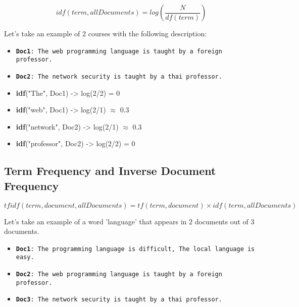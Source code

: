\begin{equation}
    idf(term, allDocuments) = log \left( \frac{N}{df(term)} \right)
\end{equation}

\noindent Let's take an example of 2 courses with the following description:
\begin{itemize}
    \item \texttt{\textbf{Doc1}: The web programming language is taught by a foreign professor.}
    \item \texttt{\textbf{Doc2}: The network security is taught by a thai professor.}
\end{itemize}

\begin{itemize}
    \item[] \textbf{idf}("The", Doc1) \hspace{1.5cm} -> \hspace{0.5cm} log(2/2) = 0
    \item[] \textbf{idf}("web", Doc1) \hspace{1.47cm} -> \hspace{0.5cm} log(2/1) $\approx$ 0.3
    \item[] \textbf{idf}("network", Doc2) \hspace{0.83cm} -> \hspace{0.5cm} log(2/1) $\approx$ 0.3
    \item[] \textbf{idf}("professor", Doc2) \hspace{0.65cm} -> \hspace{0.5cm} log(2/2) = 0
\end{itemize}

\subsection{Term Frequency and Inverse Document Frequency}

\begin{equation}
    tfidf(term, document, allDocuments) = tf(term, document) \times idf(term, allDocuments)
\end{equation}

\noindent Let's take an example of a word 'language' that appears in 2 documents out of 3 documents.

\begin{itemize}
    \item \texttt{\textbf{Doc1}: The programming language is difficult, The local language is easy.}
    \item \texttt{\textbf{Doc2}: The web programming language is taught by a foreign professor.}
    \item \texttt{\textbf{Doc3}: The network security is taught by a thai professor.}
\end{itemize}

